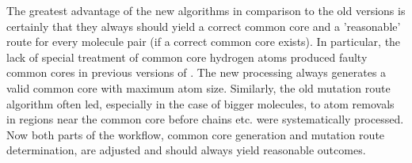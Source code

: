 The greatest advantage of the new algorithms in comparison to the old versions is certainly that they always should yield a correct common core and a 'reasonable' route for every molecule pair (if a correct common core exists). In particular, the lack of special treatment of common core hydrogen atoms produced faulty common cores in previous versions of {\trafo}. The new processing always generates a valid common core with maximum atom size. Similarly, the old mutation route algorithm often led, especially in the case of bigger molecules, to atom removals in regions near the common core before chains etc. were systematically processed. Now both parts of the workflow, common core generation and mutation route determination, are adjusted and should always yield reasonable outcomes.
